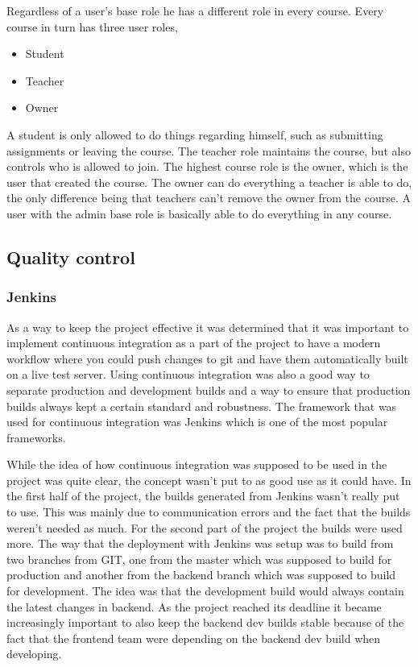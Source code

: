 Regardless of a user's base role he has a different role in every course. Every course in turn has three user roles,
\begin{itemize}
\item Student
\item Teacher
\item Owner
\end{itemize}
A student is only allowed to do things regarding himself, such as submitting assignments or leaving the course. The teacher role maintains the course, but also controls who is allowed to join. The highest course role is the owner, which is the user that created the course. The owner can do everything a teacher is able to do, the only difference being that teachers can't remove the owner from the course. A user with the admin base role is basically able to do everything in any course.

\subsection{Quality control}
\subsubsection{Jenkins}
As a way to keep the project effective it was determined that it was important to implement continuous integration as a part of the project to have a modern workflow where you could push changes to git and have them automatically built on a live test server. Using continuous integration was also a good way to separate production and development builds and a way to ensure that production builds always kept a certain standard and robustness. The framework that was used for continuous integration was Jenkins which is one of the most popular frameworks.

While the idea of how continuous integration was supposed to be used in the project was quite clear, the concept wasn't put to as good use as it could have. In the first half of the project, the builds generated from Jenkins wasn't really put to use. This was mainly due to communication errors and the fact that the builds weren't needed as much. For the second part of the project the builds were used more. The way that the deployment with Jenkins was setup was to build from two branches from GIT, one from the master which was supposed to build for production and another from the backend branch which was supposed to build for development. The idea was that the development build would always contain the latest changes in backend. As the project reached its deadline it became increasingly important to also keep the backend dev builds stable because of the fact that the frontend team were depending on the backend dev build when developing.

